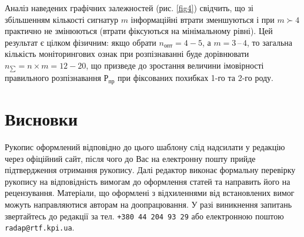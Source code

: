 Аналіз наведених графічних залежностей (рис. \ref{fig4}) свідчить, що зі збільшенням кількості сигнатур $m$ інформаційні втрати зменшуються і при $m \succ 4$  практично не змінюються (втрати фіксуються на мінімальному рівні). Цей результат є цілком фізичним: якщо обрати $n_{опт} = 4-5$, а $m = 3\,–\,4$, то загальна кількість моніторингових ознак при розпізнаванні буде дорівнювати $n_{\sum} = n \times m = 12-20$, що призведе до зростання величини імовірності правильного розпізнавання $Р_{пр}$ при фіксованих похибках 1-го та 2-го роду.

\section*{Висновки}
Рукопис оформлений відповідно до цього шаблону слід надсилати у редакцію через офіційний сайт, після чого до Вас на електронну пошту прийде підтвердження отримання рукопису. Далі редактор виконає формальну перевірку рукопису на відповідність вимогам до оформлення статей та направить його на рецензування. Матеріали, що оформлені з відхиленнями від встановлених вимог можуть направляютися авторам на доопрацювання. У разі виникнення запитань звертайтесь до редакції за тел. \texttt{+380 44 204 93 29} або електронною поштою \texttt{radap@rtf.kpi.ua}.



